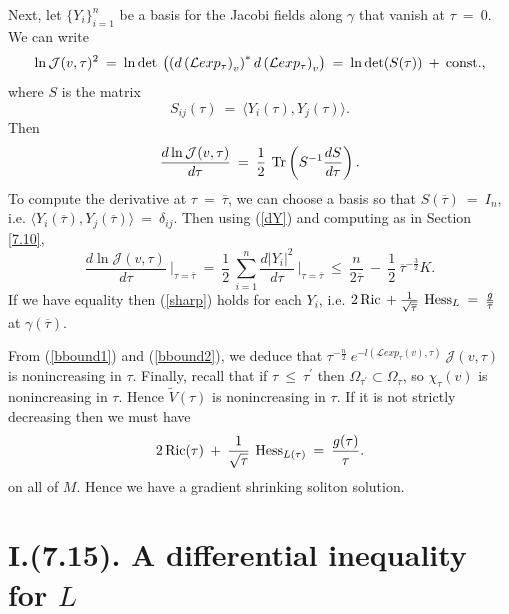 Next, let
$\{Y_i\}_{i=1}^n$ be a basis for the Jacobi fields along $\gamma$
that vanish at $\tau \: =\: 0$.
We can write
\begin{equation}
\ln {\mathcal J}(v, \tau)^2 \: = \:
\ln \det \: \left( \left( d\left( {\mathcal L}exp_\tau \right)_v \right)^*
d\left( {\mathcal L}exp_\tau \right)_v \right) \: = \: \ln \det(S(\tau))
\: + \: \operatorname{const.},
\end{equation}
where $S$ is the matrix
\begin{equation}
S_{ij}(\tau) \: = \: \langle Y_i(\tau), Y_j(\tau) \rangle.
\end{equation}
Then
\begin{equation}
\frac{d\ln {\mathcal J}(v, \tau)}{d\tau} \: = \: \frac12 \:
\operatorname{Tr} \left( S^{-1} \frac{dS}{d\tau} \right).
\end{equation}
To compute the derivative at $\tau \: = \: \overline{\tau}$, we can choose
a basis so that $S(\overline{\tau}) \: = \: I_n$, i.e.
$\langle Y_i(\overline{\tau}), Y_j(\overline{\tau}) \rangle
\: = \: \delta_{ij}$.
Then using (\ref{dY}) and computing as in Section \ref{7.10},
\begin{equation} \label{bbound2}
\frac{d\ln {\mathcal J}(v, \tau)}{d\tau}
\: \Big|_{\tau = \overline{\tau}}
\: = \: \frac12 \: \sum_{i=1}^n
\frac{d|Y_i|^2}{d\tau} \: \Big|_{\tau = \overline{\tau}}
\: \le \: \frac{n}{2\overline{\tau}} \: - \:
\frac{1}{2} \: \overline{\tau}^{-\frac32} K.
\end{equation}
If we have equality then (\ref{sharp}) holds for each
$Y_i$, i.e. $2 \operatorname{Ric} \: + \: \frac{1}{\sqrt{\overline{\tau}}} \:
\operatorname{Hess}_L \: =\: \frac{g}{\overline{\tau}}$ at $\gamma(\overline{\tau})$.

From (\ref{bbound1}) and (\ref{bbound2}), we deduce that
$\tau^{-\frac{n}{2}} \:
e^{-l({\mathcal L}exp_\tau(v),\tau)} \: {\mathcal J}(v, \tau)$ is
nonincreasing in $\tau$.
Finally, recall that if
$\tau \: \le \: \tau^\prime$ then $\Omega_{\tau^\prime} \subset
\Omega_\tau$, so $\chi_\tau(v)$ is nonincreasing in $\tau$. Hence
$\tilde{V}(\tau)$ is nonincreasing in $\tau$. If it is not
strictly decreasing then we must have
\begin{equation}
2 \operatorname{Ric}(\tau) \: + \: \frac{1}{\sqrt{\tau}} \: \operatorname{Hess}_{L(\tau)}
\: = \: \frac{g(\tau)}{\tau}.
\end{equation}
on all of $M$. Hence we have a gradient shrinking soliton solution.

\section{I.(7.15). A differential inequality for $L$} \label{I.(7.15)}

